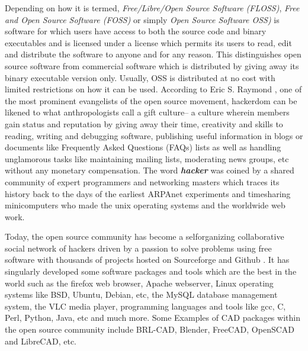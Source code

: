 \hspace{30} Depending   on   how it is termed, \textit{Free/Libre/Open   Source  
Software   (FLOSS)},   \textit{Free   and   Open   Source   Software   (FOSS)}   or   simply   \textit{Open  
Source   Software   OSS)}   is   software   for   which   users   have   access   to   both   the  
source   code   and   binary   executables   and   is   licensed   under   a   license   which  
permits   its   users   to   read,   edit   and   distribute   the   software   to   anyone   and   for   any  
reason.   This   distinguishes   open   source   software   from   commercial   software  
which   is   distributed   by   giving   away   its   binary   executable   version   only.   Usually,  
OSS   is   distributed   at   no   cost   with   limited   restrictions   on   how   it   can   be   used.  
According   to   Eric   S.   Raymond \cite{33},   one   of   the   most   prominent   evangelists   of  
the   open   source   movement,   hackerdom   can   be   likened   to   what   anthropologists  
call   a   gift   culture–   a   culture   wherein   members   gain   status   and   reputation   by  
giving   away   their   time,   creativity   and   skills   to   reading,   writing   and   debugging  
software,   publishing   useful   information   in   blogs   or   documents   like   Frequently  
Asked   Questions   (FAQs)   lists   as   well   as   handling   unglamorous   tasks   like  
maintaining   mailing   lists,   moderating   news   groups,   etc   without   any   monetary  
compensation.   The   word   \textit{\textbf{hacker}}   was   coined   by   a   shared   community   of   expert  
programmers   and   networking   masters   which   traces   its   history   back   to   the   days  
of   the   earliest   ARPAnet   experiments   and   time­sharing   minicomputers   who  
made   the   unix   operating   systems   and   the   world­wide   web   work.   

\hspace{30} Today,   the   open   source   community   has   become   a   self­organizing  
collaborative   social   network   of   hackers   driven   by   a   passion   to   solve   problems  
using   free   software   with   thousands   of   projects   hosted   on   Sourceforge \cite{34}   and  
Github \cite{35}.   It   has   singularly   developed   some   software   packages   and   tools  
which   are   the   best   in   the   world   such   as   the   firefox   web   browser,   Apache  
web­server,   Linux   operating   systems   like   BSD,   Ubuntu,   Debian, etc,   the   MySQL  
database   management   system,   the   VLC   media   player,   programming  languages   and   tools   like   gcc,   C,   Perl,   Python,   Java,   etc   and   much   more.   Some  Examples   of   CAD   packages   within   the   open   source  community   include   BRL-­CAD,   Blender,   FreeCAD,   OpenSCAD   and   LibreCAD,  
etc.


